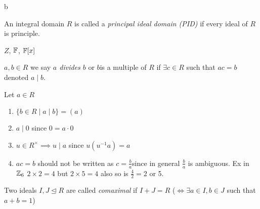 b\documentclass[master.tex]{subfiles}
\begin{document}
\begin{defn}
  An integral domain \(R\) is called a \emph{principal ideal domain (PID)} if every ideal of \(R\) is principle. 
\end{defn}

\begin{examples}
  \(Z\), \(\mathbb{F}\), \(\mathbb{F}[x]\)
\end{examples}

\begin{notation}
  \(a,b \in R\) we say \emph{\(a\) divides \(b\)} or \(b\)is a multiple of \(R\) if \(\exists c \in R\) such that
  \(ac=b\) denoted \(a \mid b\).
\end{notation}

\begin{rmk} Let \(a \in R\)
  \begin{enumerate}[label=(\alph*)]
  \item \(\{b \in R \mid a \mid b\}=(a)\)
  \item \(a \mid 0\) since \(0=a \cdot 0 \) 
  \item  \(u \in R^\times \implies u \mid a\) since \(u(u^{-1}a)=a\)
  \item \(ac=b\) should not be written as \(c=\frac{b}{a}\)since in general \(\frac{b}{a}\) is ambiguous. Ex in \({\mathbb Z}_6\)
    \(2 \times 2 = 4\) but \(2 \times 5 = 4\) also so is \(\frac{4}{2}=2\) or 5.
  \end{enumerate}
\end{rmk}

\begin{defn}
  Two ideals \(I, J \unlhd R\) are called \emph{comaximal} if \(I+J=R\) (\(\iff \exists a \in I, b \in J\) such that \(a+b=1\))
\end{defn}
\end{document}
